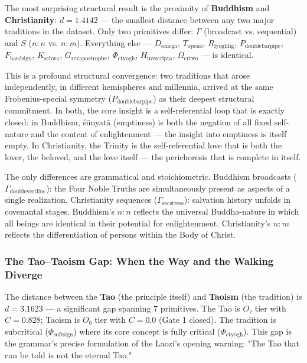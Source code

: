 \documentclass[12pt,a4paper]{article}
\begin{document}
The most surprising structural result is the proximity of \textbf{Buddhism} and \textbf{Christianity}: $d = 1.4142$ --- the smallest distance between any two major traditions in the dataset. Only two primitives differ: $\Gamma$ (broadcast vs. sequential) and $S$ ($n{:}n$ vs. $n{:}m$). Everything else --- $D_{\text{omega}}$, $T_{\text{openo}}$, $R_{\text{lyoghlig}}$, $P_{\text{doublebarpipe}}$, $F_{\text{hardsign}}$, $K_{\text{schwa}}$, $G_{\text{revapostrophe}}$, $\Phi_{\text{ctyogh}}$, $H_{\text{invscripta}}$, $\Omega_{\text{crtwo}}$ --- is identical.

This is a profound structural convergence: two traditions that arose independently, in different hemispheres and millennia, arrived at the same Frobenius-special symmetry ($P_{\text{doublebarpipe}}$) as their deepest structural commitment. In both, the core insight is a self-referential loop that is exactly closed: in Buddhism, śūnyatā (emptiness) is both the negation of all fixed self-nature and the content of enlightenment --- the insight into emptiness is itself empty. In Christianity, the Trinity is the self-referential love that is both the lover, the beloved, and the love itself --- the perichoresis that is complete in itself.

The only differences are grammatical and stoichiometric. Buddhism broadcasts ($\Gamma_{\text{doublevertline}}$): the Four Noble Truths are simultaneously present as aspects of a single realization. Christianity sequences ($\Gamma_{\text{secstress}}$): salvation history unfolds in covenantal stages. Buddhism's $n{:}n$ reflects the universal Buddha-nature in which all beings are identical in their potential for enlightenment. Christianity's $n{:}m$ reflects the differentiation of persons within the Body of Christ.

\subsubsection{The Tao--Taoism Gap: When the Way and the Walking Diverge}

The distance between the \textbf{Tao} (the principle itself) and \textbf{Taoism} (the tradition) is $d = 3.1623$ --- a significant gap spanning 7 primitives. The Tao is $O₂$ tier with $C = 0.828$; Taoism is $O₀$ tier with $C = 0.0$ (Gate 1 closed). The tradition is subcritical ($\Phi_{\text{softsign}}$) where its core concept is fully critical ($\Phi_{\text{ctyogh}}$). This gap is the grammar's precise formulation of the Laozi's opening warning: "The Tao that can be told is not the eternal Tao."
\end{document}
